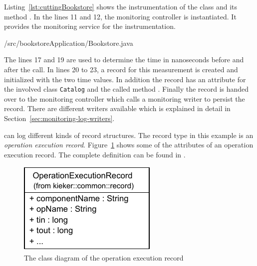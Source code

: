 Listing~\ref{lst:cuttingBookstore} shows the instrumentation of the  class and its method . In the lines 11 and 12, the monitoring controller is instantiated. It provides the monitoring service for the instrumentation.


\setJavaCodeListing
%
{\manualInstrumentedBookstoreApplicationDir/src/bookstoreApplication/Bookstore.java}
 
\noindent The lines 17 and 19 are used to determine the time in nanoseconds before and after the  call. In lines 20 to 23, a record for this measurement is created and initialized with the two time values. In addition the record has an attribute for the involved class \verb!Catalog! and the called method . Finally the record is handed over to the monitoring controller which calls a monitoring writer to persist the record. There are different writers available which is explained in detail in Section~\ref{sec:monitoring-log-writers}.

\Kieker{} can log different kinds of record structures. The record type in this example is an \textit{operation execution record}. Figure~\ref{fig:OperationExecutionRecordClassDiagram} shows some of the attributes of an operation execution record. The complete definition can be found in .

\begin{figure}[H]
\begin{centering}
\includegraphics[scale=1]{images/kieker_OperationExecutionRecord-notraceattributes}%
\caption{The class diagram of the operation execution record}
\label{fig:OperationExecutionRecordClassDiagram}
\end{centering}
\end{figure}

